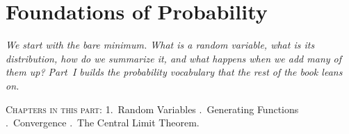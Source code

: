 \part{Foundations of Probability}

\begin{fullwidth}
\noindent\textit{We start with the bare minimum. What is a random variable, what is its distribution, how do we summarize it, and what happens when we add many of them up? Part~I builds the probability vocabulary that the rest of the book leans on.}

\medskip
\noindent\textsc{Chapters in this part:} 1.~Random Variables .~Generating Functions .~Convergence .~The Central Limit Theorem.
\end{fullwidth}
